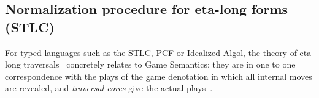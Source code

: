 \documentclass[xchauthor,chkrefs,GCNS,amsmath,amsthm,rotating,leaveRGB]{tcsg}
\theoremstyle{plain}
\theoremstyle{definition}
\newcommand\travset{\mathcal{T}\!rav}
\newcommand{\Nodes}{\mathcal{N}}
\newcommand{\NodesVar}{\Nodes_{\mathsf{var}}}
\newcommand{\essential}{\mathsf{ess}}
\newcommand{\travsetes}{{\travset_{\essential}}}
\newcommand{\travulc}{\travset}
\def\coresymbol{\pi}
\newcommand{\core}[1]{\coresymbol(#1)}
\begin{document}
%
%


\subsection{Normalization procedure for eta-long forms (STLC)}\label{sec4.2}

For typed languages such as the STLC, PCF or Idealized Algol, the theory of
eta-long traversals~\cite{OngLics2006} concretely relates to Game Semantics:
they are in one to one correspondence with the plays of the game denotation
in which all internal moves are revealed, and \emph{traversal cores} give the
actual plays~\cite{BlumPhd}.
\end{document}
